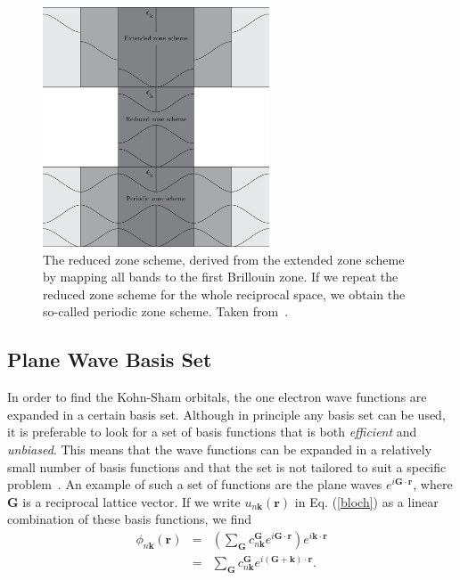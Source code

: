 \begin{refsection}
\begin{figure}[!h] 
\captionsetup{width=0.8\textwidth}
\centering
\includegraphics[width=0.6\textwidth]{./Figures/DFT/reduced.png}
\caption{\label{fig:reduced}The reduced zone scheme, derived from the extended zone scheme by mapping all bands to the first Brillouin zone. If we repeat the reduced zone scheme for the whole reciprocal space, we obtain the so-called periodic zone scheme. Taken from~\cite{Kittel2005}.}
\end{figure}

\subsection{Plane Wave Basis Set} \label{dft:sec-planewave}

In order to find the Kohn-Sham orbitals, the one electron wave functions are expanded in a certain basis set. Although in principle any basis set can be used, it is preferable to look for a set of basis functions that is both \textit{efficient} and \textit{unbiased}. This means that the wave functions can be expanded in a relatively small number of basis functions and that the set is not tailored to suit a specific problem~\cite{Cottenier2004}. An example of such a set of functions are the plane waves $e^{i \mathbf{G}\cdot \mathbf{r}}$, where $\mathbf{G}$ is a reciprocal lattice vector. If we write $u_{n\mathbf{k}}(\mathbf{r})$ in Eq. (\ref{bloch}) as a linear combination of these basis functions, we find
\begin{eqnarray}
\phi_{n\mathbf{k}}(\mathbf{r}) &=& \left( \sum_{\mathbf{G}} c_{n\mathbf{k}}^{\mathbf{G}}e^{i\mathbf{G}\cdot \mathbf{r}} \right) e^{i\mathbf{k}\cdot \mathbf{r}}
\\ &=& \sum_{\mathbf{G}} c_{n\mathbf{k}}^{\mathbf{G}}e^{i(\mathbf{G}+\mathbf{k})\cdot \mathbf{r}}.
\end{eqnarray}


\end{refsection}

